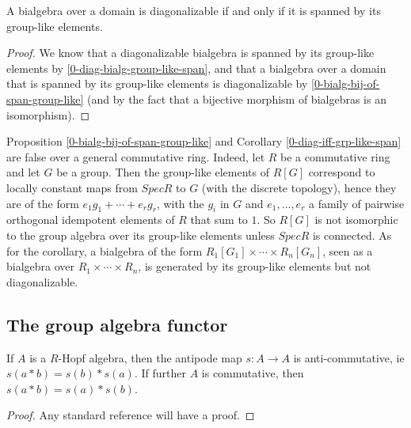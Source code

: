 \begin{corollary}
  \label{0-bialg-diag-of-span-group-like}
  \leanok

  A bialgebra over a domain is diagonalizable if and only if it is spanned by its
  group-like elements.
\end{corollary}
\begin{proof}
  \leanok

  We know that a diagonalizable bialgebra is spanned by its group-like elements
  by \ref{0-diag-bialg-group-like-span}, and that a bialgebra over a domain
  that is spanned by its group-like elements is diagonalizable by
  \ref{0-bialg-bij-of-span-group-like} (and by the fact that a bijective morphism
  of bialgebras is an isomorphism).
\end{proof}

Proposition \ref{0-bialg-bij-of-span-group-like} and Corollary \ref{0-diag-iff-grp-like-span} are false over a general commutative ring.
Indeed, let $R$ be a commutative ring and let $G$ be a group.
Then the group-like elements of $R[G]$ correspond to locally constant maps from $Spec R$ to $G$ (with the discrete topology),
hence they are of the form $e_1 g_1+\cdots+e_r g_r$, with the $g_i$ in $G$ and $e_1,\ldots,e_r$ a family of pairwise orthogonal idempotent elements of $R$ that sum to $1$.
So $R[G]$ is not isomorphic to the group algebra over its group-like elements unless $Spec R$ is connected.
As for the corollary, a bialgebra of the form $R_1[G_1]\times\cdots\times R_n[G_n]$,
seen as a bialgebra over $R_1\times\cdots\times R_n$,
is generated by its group-like elements but not diagonalizable.


\subsection{The group algebra functor}


\begin{proposition}
  \label{0-antipode-mul}
  \uses{}
  \leanok

  If $A$ is a $R$-Hopf algebra, then the antipode map $s : A \to A$ is anti-commutative, ie $s(a * b) = s(b) * s(a)$. If further $A$ is commutative, then $s(a * b) = s(a) * s(b)$.
\end{proposition}
\begin{proof}
  \uses{}
  \leanok

  Any standard reference will have a proof.
\end{proof}


